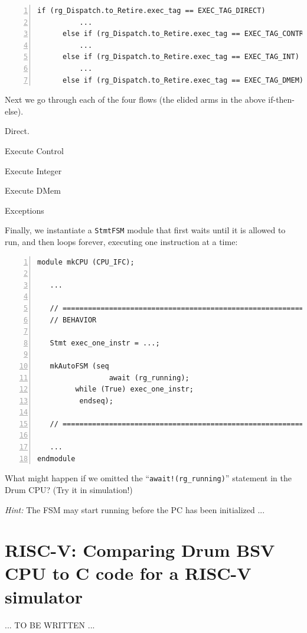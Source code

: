 {\small
\begin{Verbatim}[frame=single, numbers=left, label=Broad sructure of Drum Execute and Retire]
      if (rg_Dispatch.to_Retire.exec_tag == EXEC_TAG_DIRECT)
          ...
      else if (rg_Dispatch.to_Retire.exec_tag == EXEC_TAG_CONTROL)
          ...
      else if (rg_Dispatch.to_Retire.exec_tag == EXEC_TAG_INT)
          ...
      else if (rg_Dispatch.to_Retire.exec_tag == EXEC_TAG_DMEM)
\end{Verbatim}
}

Next we go through each of the four flows (the elided arms in the
above if-then-else).

Direct.



Execute Control



Execute Integer



Execute DMem



Exceptions






Finally, we instantiate a \verb|StmtFSM| module that first waits until
it is allowed to run, and then loops forever, executing one
instruction at a time:

{\small
\begin{Verbatim}[frame=single, numbers=left]
module mkCPU (CPU_IFC);

   ...

   // ================================================================
   // BEHAVIOR

   Stmt exec_one_instr = ...;

   mkAutoFSM (seq
                 await (rg_running);
		 while (True) exec_one_instr;
	      endseq);

   // ================================================================

   ...
endmodule
\end{Verbatim}
}

\hdivider

\Exercise

What might happen if we omitted the ``{\tt await!(rg\_running)}''
statement in the Drum CPU? (Try it in simulation!)

\emph{Hint:} The FSM may start running before the PC has been initialized ...

\Endexercise


\section{RISC-V: Comparing Drum BSV CPU to C code for a RISC-V simulator}

... TO BE WRITTEN ...

